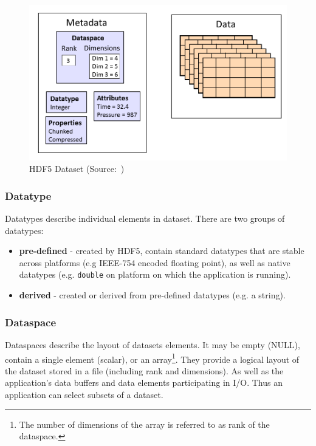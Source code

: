 \documentclass[thesis=M,english]{FITthesis}[2019/12/23]
\begin{document}
\begin{figure}[H]
    \centering
    \includegraphics[scale=0.3]{static/dataset.png}
    \caption{HDF5 Dataset (Source:~\cite{hdf5})}
\end{figure}

\subsubsection{Datatype}

Datatypes describe individual elements in dataset. There are two groups of datatypes:
\begin{itemize}
    \item \textbf{pre-defined} - created by HDF5, contain standard datatypes that are stable across platforms
          (e.g IEEE-754 encoded floating point), as well as native datatypes (e.g. \texttt{double} on platform
          on which the application is running).
    \item \textbf{derived} - created or derived from pre-defined datatypes (e.g. a string).
\end{itemize}

\subsubsection{Dataspace}

Dataspaces describe the layout of datasets elements. It may be empty (NULL), contain a single element (scalar),
or an array\footnote{The number of dimensions of the array is referred to as rank of the dataspace.}. They provide
a logical layout of the dataset stored in a file (including rank and dimensions). As well as the application's data buffers
and data elements participating in I/O. Thus an application can select subsets of a dataset.
\end{document}
